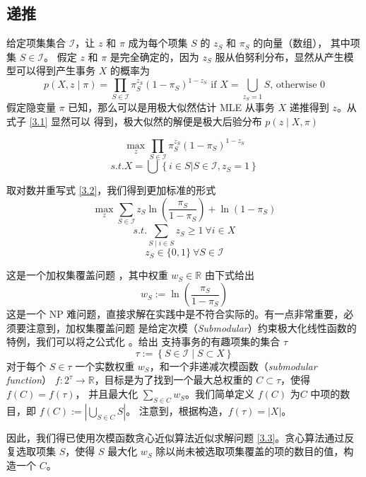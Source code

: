 \documentclass{ctexart}
\newcommand{\scri}[0]{\mathcal{I}}
\begin{document}
\subsection{递推}

给定项集集合 $\scri$，让 $z$ 和 $\pi$ 成为每个项集 $S$ 的 $z_S$ 和 $\pi_S$ 的向量（数组），
其中项集 $S \in \scri$。
假定 $z$ 和 $\pi$ 是完全确定的，因为 $z_S$ 服从伯努利分布，显然从产生模型可以得到产生事务 $X$ 的概率为
\begin{equation}
\label{3.1}
p(X, z \mid \pi) = \prod_{S \in \scri} \pi_S^{z_S} (1 - \pi_S)^{1 - z_S}
\text{ if } X = \bigcup_{z_S = 1} S \text{, otherwise } 0
\end{equation}
假定隐变量  $\pi$ 已知，那么可以是用极大似然估计 MLE 从事务 $X$ 递推得到 $z$。从式子 \ref{3.1} 显然可以
得到，极大似然的解便是极大后验分布 $p(z \mid X, \pi)$

\begin{equation}
\label{3.2}
\max_z \prod_{S \in \scri} \pi_S^{z_S} (1 - \pi_S)^{1 - z_S}
\end{equation}
$$
s.t. X = \bigcup \left\{ i \in S | S \in \scri, z_S = 1 \right\}
$$

取对数并重写式 \ref{3.2}，我们得到更加标准的形式
\begin{equation}
\label{3.3}
\max_z \sum_{S \in \scri} z_S \ln \left( \frac{\pi_S}{1 - \pi_S} \right) + \ln \left(1 - \pi_S \right)
\end{equation}
$$
s.t. \sum_{S \mid i \in S} z_S \geq 1 \ \forall i \in X
$$
$$
z_S \in \{0, 1\} \ \forall S \in \scri
$$

这是一个加权集覆盖问题 \cite{weighted-set-cover}，其中权重 $w_S \in \mathbb{R} $ 由下式给出
$$
w_S := \ln\left( \frac{\pi_S}{1 - \pi_S} \right)
$$
这是一个 NP 难问题，直接求解在实践中是不符合实际的。有一点非常重要，必须要注意到，加权集覆盖问题
是给定次模（\textit{Submodular}）约束极大化线性函数的特例，我们可以将之公式化 \cite{young}。给出
支持事务的有趣项集的集合 $\tau$
\begin{equation}
\label{3.4}
\tau := \left\{ S \in \scri \mid S \subset X \right\}
\end{equation}
对于每个 $S \in \tau$ 一个实数权重 $w_S$，和一个非递减次模函数（\textit{submodular function}）
$f: 2^\tau \to \mathbb{R}$，目标是为了找到一个最大总权重的 $C \subset \tau$，使得 $f(C) = f(\tau)$，
并且最大化 $\sum_{S \in C} w_S$。我们简单定义 $f(C)$ 为$C$ 中项的数目，即 $f(C) := | \bigcup_{S \in C} S |$。
注意到，根据构造，$f(\tau) = | X | $。

因此，我们得已使用次模函数贪心近似算法近似求解问题 \ref{3.3}。贪心算法通过反复选取项集 $S$，使得
$S$ 最大化 $w_S$ 除以尚未被选取项集覆盖的项的数目的值，构造一个 $C$。
\end{document}
